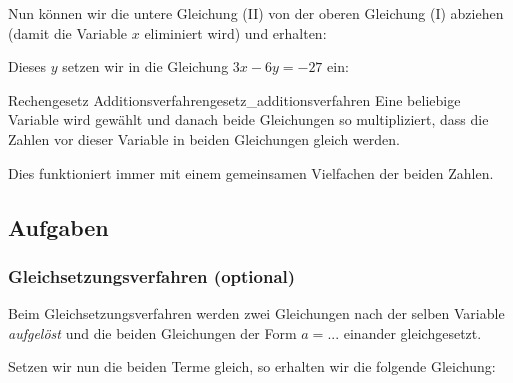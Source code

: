 Nun können wir die untere Gleichung (II) von der oberen Gleichung (I) abziehen (damit die Variable $x$ eliminiert wird)
und erhalten:
  


  Dieses $y$ setzen wir \zB in die Gleichung $3x-6y=-27$ ein:
\newpage


  \begin{rezept}{Rechengesetz Additionsverfahren}{gesetz_additionsverfahren}
    Eine beliebige Variable wird gewählt und danach beide Gleichungen so multipliziert,
    dass die Zahlen vor dieser Variable in beiden Gleichungen gleich werden.

    Dies funktioniert
    immer mit einem gemeinsamen Vielfachen der beiden Zahlen.
  \end{rezept}

\subsection*{Aufgaben}

\newpage


\subsubsection{Gleichsetzungsverfahren (optional)}\label{lin_gl_gleichsetzungsverfahren}
Beim Gleichsetzungsverfahren werden zwei Gleichungen nach der selben Variable \textit{aufgelöst} und die beiden Gleichungen der Form $a = ...$ einander gleichgesetzt.

\vspace{22mm}

Setzen wir nun die beiden Terme gleich, so erhalten wir die
folgende Gleichung:


